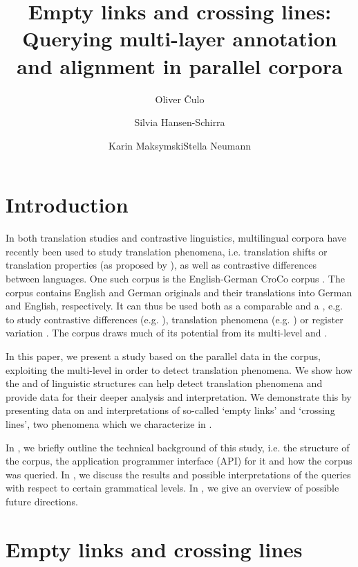 \documentclass[output=paper]{LSP/langsci}
\author{Oliver Čulo\and 
Silvia Hansen-Schirra\and 
Karin Maksymski\affiliation{Johannes Gutenberg-Universität Mainz in Germersheim}\lastand Stella Neumann\affiliation{IFAAR, RWTH Aachen}
}
\title{Empty links and crossing lines: Querying multi-layer annotation and alignment in parallel corpora}
\begin{document}




\section{Introduction}\label{sec:culo:1}

In both translation studies and contrastive linguistics, multilingual corpora have recently been used to study translation phenomena, i.e. translation shifts or translation properties (as proposed by \citealt{Baker1993, Baker1995, Toury1995}), as well as contrastive differences between languages. One such corpus is the English-German CroCo corpus \citep{Hansen-SchirraEtAlfc}. The corpus contains English and German originals and their translations into German and English, respectively. It can thus be used both as a comparable and a , e.g. to study contrastive differences (e.g. \citealt{Steiner2008}), translation phenomena (e.g. \citealt{CuloEtAl2008,Hansen-SchirraEtAl2007}) or register variation \citep{Neumann2008}. The corpus draws much of its potential from its multi-level  and  \citep{Hansen-SchirraEtAl2006}.

In this paper, we present a study based on the parallel data in the corpus, exploiting the multi-level  in order to detect translation phenomena. We show how the  and  of linguistic structures can help detect translation phenomena and provide data for their deeper analysis and interpretation. We demonstrate this by presenting data on and interpretations of so-called `empty links' and `crossing lines', two phenomena which we characterize in .

In , we briefly outline the technical background of this study, i.e. the structure of the corpus, the application programmer interface (API) for it and how the corpus was queried. In , we discuss the results and possible interpretations of the queries with respect to certain grammatical levels. In , we give an overview of possible future directions. 

\section{Empty links and crossing lines}\label{sec:culo:2}
\end{document}
